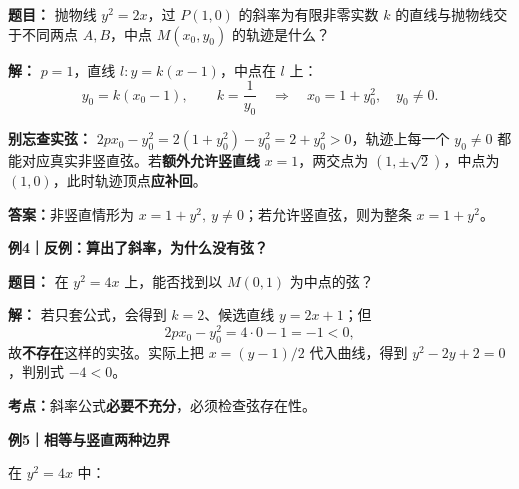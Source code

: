 \begin{examplebox}
\begin{minipage}{\linewidth}
\par\noindent\textbf{题目：} 抛物线 $y^2=2x$，过 $P(1,0)$ 的斜率为有限非零实数 $k$ 的直线与抛物线交于不同两点 $A,B$，中点 $M(x_0,y_0)$ 的轨迹是什么？
\par
\end{minipage}
\par\smallskip
\par\noindent\textbf{解：} $p=1$，直线 $l:y=k(x-1)$，中点在 $l$ 上：
\[
 y_0=k(x_0-1),\qquad k=\frac{1}{y_0}
 \quad\Longrightarrow\quad
 \boxed{x_0=1+y_0^2,\quad y_0\ne0}.
\]
\par\noindent\textbf{别忘查实弦：} $2px_0-y_0^2=2(1+y_0^2)-y_0^2=2+y_0^2>0$，轨迹上每一个 $y_0\ne0$ 都能对应真实非竖直弦。若\textbf{额外允许竖直线} $x=1$，两交点为 $(1,\pm\sqrt2)$，中点为 $(1,0)$，此时轨迹顶点\textbf{应补回}。
\par\noindent\textbf{答案：}非竖直情形为 $x=1+y^2,\ y\ne0$；若允许竖直弦，则为整条 $x=1+y^2$。
\par\medskip
\begin{minipage}{\linewidth}
\noindent
\textbf{\textcolor{CExample}{例4｜反例：算出了斜率，为什么没有弦？}}\par\nobreak\smallskip
\par\noindent\textbf{题目：} 在 $y^2=4x$ 上，能否找到以 $M(0,1)$ 为中点的弦？
\par
\end{minipage}
\par\smallskip
\par\noindent\textbf{解：} 若只套公式，会得到 $k=2$、候选直线 $y=2x+1$；但
\[
 2px_0-y_0^2=4\cdot0-1=-1<0,
\]
故\textbf{不存在}这样的实弦。实际上把 $x=(y-1)/2$ 代入曲线，得到 $y^2-2y+2=0$，判别式 $-4<0$。
\par\noindent\textbf{考点：}斜率公式\textbf{必要不充分}，必须检查弦存在性。
\par\medskip
\begin{minipage}{\linewidth}
\noindent
\textbf{\textcolor{CExample}{例5｜相等与竖直两种边界}}\par\nobreak\smallskip
在 $y^2=4x$ 中：\par
\end{minipage}
\par


\end{examplebox}

